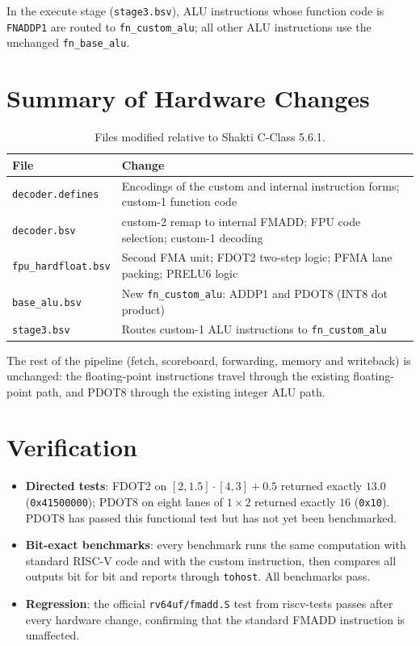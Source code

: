 In the execute stage (\texttt{stage3.bsv}), ALU instructions whose function
code is \texttt{FNADDP1} are routed to \texttt{fn\_custom\_alu}; all other ALU
instructions use the unchanged \texttt{fn\_base\_alu}.

\section{Summary of Hardware Changes}

\begin{table}[h]
\centering
\begin{tabular}{lp{9.5cm}}\toprule
File & Change\\\midrule
\texttt{decoder.defines} & Encodings of the custom and internal instruction forms; custom-1 function code\\
\texttt{decoder.bsv} & custom-2 remap to internal FMADD; FPU code selection; custom-1 decoding\\
\texttt{fpu\_hardfloat.bsv} & Second FMA unit; FDOT2 two-step logic; PFMA lane packing; PRELU6 logic\\
\texttt{base\_alu.bsv} & New \texttt{fn\_custom\_alu}: ADDP1 and PDOT8 (INT8 dot product)\\
\texttt{stage3.bsv} & Routes custom-1 ALU instructions to \texttt{fn\_custom\_alu}\\\bottomrule
\end{tabular}
\caption{Files modified relative to Shakti C-Class 5.6.1.}
\end{table}

The rest of the pipeline (fetch, scoreboard, forwarding, memory and
writeback) is unchanged: the floating-point instructions travel through the
existing floating-point path, and PDOT8 through the existing integer ALU path.

\section{Verification}

\begin{itemize}
  \item \textbf{Directed tests}: FDOT2 on $[2, 1.5]\cdot[4, 3] + 0.5$ returned
        exactly $13.0$ (\texttt{0x41500000}); PDOT8 on eight lanes of
        $1 \times 2$ returned exactly $16$ (\texttt{0x10}). PDOT8 has passed
        this functional test but has not yet been benchmarked.
  \item \textbf{Bit-exact benchmarks}: every benchmark runs the same
        computation with standard RISC-V code and with the custom instruction,
        then compares all outputs bit for bit and reports through
        \texttt{tohost}. All benchmarks pass.
  \item \textbf{Regression}: the official \texttt{rv64uf/fmadd.S} test from
        riscv-tests passes after every hardware change, confirming that the
        standard FMADD instruction is unaffected.
\end{itemize}

